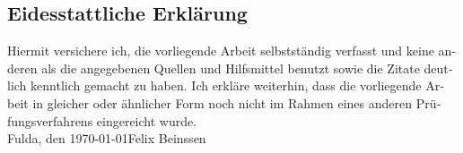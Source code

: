 \newpage
\begin{otherlanguage}{ngerman}
\thispagestyle{empty}
\section*{Eidesstattliche Erklärung}
\thispagestyle{empty}
Hiermit versichere ich, die vorliegende Arbeit selbstständig verfasst und keine anderen als die angegebenen Quellen und Hilfsmittel benutzt sowie die Zitate deutlich kenntlich gemacht zu haben.
\newline
Ich erkläre weiterhin, dass die vorliegende Arbeit in gleicher oder ähnlicher Form noch nicht im Rahmen eines
anderen Prüfungsverfahrens eingereicht wurde.
\vspace{4\baselineskip}\\
Fulda, den \today \hfill Felix Beinssen
\vspace{4\baselineskip}\\
\end{otherlanguage}